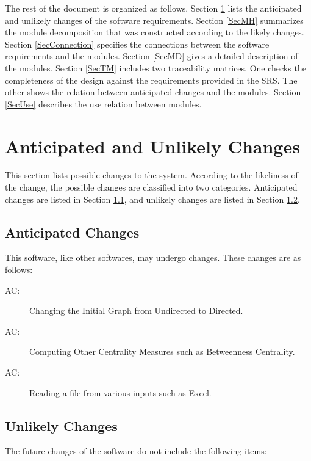 \documentclass[12pt, titlepage]{article}
\newcounter{acnum}
\newcommand{\actheacnum}{AC\theacnum}
\begin{document}
The rest of the document is organized as follows. Section
\ref{SecChange} lists the anticipated and unlikely changes of the software
requirements. Section \ref{SecMH} summarizes the module decomposition that
was constructed according to the likely changes. Section \ref{SecConnection}
specifies the connections between the software requirements and the
modules. Section \ref{SecMD} gives a detailed description of the
modules. Section \ref{SecTM} includes two traceability matrices. One checks
the completeness of the design against the requirements provided in the SRS. The
other shows the relation between anticipated changes and the modules. Section
\ref{SecUse} describes the use relation between modules.

\section{Anticipated and Unlikely Changes} \label{SecChange}

This section lists possible changes to the system. According to the likeliness
of the change, the possible changes are classified into two
categories. Anticipated changes are listed in Section \ref{SecAchange}, and
unlikely changes are listed in Section \ref{SecUchange}.

\subsection{Anticipated Changes} \label{SecAchange}

This software, like other softwares, may undergo changes. These changes are as follows:

\begin{description}
\item[ \actheacnum \label{acHardware}:] Changing the Initial Graph from Undirected to Directed.
\item[ \actheacnum \label{acInput}:] Computing Other Centrality Measures such as Betweenness Centrality.
\item[ \actheacnum \label{computation}:]  Reading a file from various inputs such as Excel.
\end{description}

\subsection{Unlikely Changes} \label{SecUchange}

The future changes of the software do not include the following items:
\end{document}

